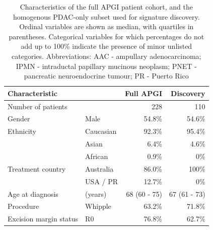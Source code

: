 \documentclass[dissertation.tex]{subfiles}
\begin{document}
\begin{table}[h]
\centering
\caption[Characteristics of the \gls{APGI} patient cohorts]{Characteristics of the full \gls{APGI} patient cohort, and the homogenous \gls{PDAC}-only subset used for signature discovery.  Ordinal variables are shown as median, with quartiles in parentheses.  Categorical variables for which percentages do not add up to 100\% indicate the presence of minor unlisted categories.  Abbreviations: AAC - ampullary adenocarcinoma; IPMN - intraductal papillary mucinous neoplasm; PNET - pancreatic neuroendocrine tumour; PR - Puerto Rico}\label{tab:sigs-cohort-characteristics}
\begin{tabular}{@{}llrr@{}}
\toprule
Characteristic             &                          & Full \gls{APGI} & Discovery \\ \midrule
Number of patients         &                          & 228                      & 110                                                    \\
Gender                     & Male                     & 54.8\%                   & 54.6\%                                                 \\
Ethnicity                  & Caucasian                & 92.3\%                   & 95.4\%                                                 \\
                           & Asian                    & 6.4\%                    & 4.6\%                                                  \\
                           & African                  & 0.9\%                    & 0\%                                                    \\
Treatment country          & Australia                & 86.0\%                   & 100\%                                                  \\
                           & USA / PR        & 12.7\%                   & 0\%                                                    \\
Age at diagnosis           & (years)                  & 68 (60 - 75)               & 67 (61 - 73)                                             \\
Procedure                  & Whipple                  & 63.2\%                   & 71.8\%                                                 \\
Excision margin status     & R0                       & 76.8\%                   & 62.7\%                                                 \\

\end{tabular}
\end{table}
\end{document}
